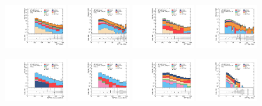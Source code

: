 \begin{figure}

    \centering

    \includegraphics[width=0.24\textwidth]{images/analysis_EWK/v192_1_nosyst/can_VRW_met_et_afterFit.pdf}
    \includegraphics[width=0.24\textwidth]{images/analysis_EWK/v192_1_nosyst/can_VRW_met_sig_obj_afterFit.pdf}
    \includegraphics[width=0.24\textwidth]{images/analysis_EWK/v192_1_nosyst/can_VRT_met_et_afterFit.pdf}
    \includegraphics[width=0.24\textwidth]{images/analysis_EWK/v192_1_nosyst/can_VRT_met_sig_obj_afterFit.pdf}

    \includegraphics[width=0.24\textwidth]{images/analysis_EWK/v192_1_nosyst/can_VRZee_met_noele_et_afterFit.pdf}
    \includegraphics[width=0.24\textwidth]{images/analysis_EWK/v192_1_nosyst/can_VRZmm_met_nomuon_et_afterFit.pdf}
    \includegraphics[width=0.24\textwidth]{images/analysis_EWK/v192_1_nosyst/can_VRE_met_et_afterFit.pdf}
    \includegraphics[width=0.24\textwidth]{images/analysis_EWK/v192_1_nosyst/can_VRE_met_sig_obj_afterFit.pdf}


\end{figure}
